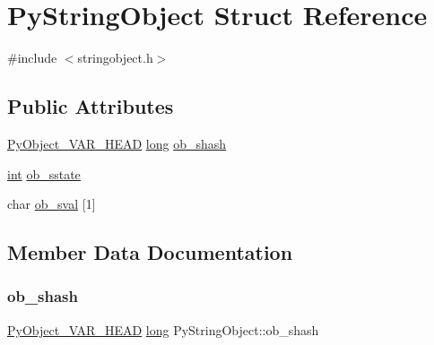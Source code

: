 \hypertarget{struct_py_string_object}{}\section{Py\+String\+Object Struct Reference}
\label{struct_py_string_object}


{\ttfamily \#include $<$stringobject.\+h$>$}

\subsection*{Public Attributes}
\begin{DoxyCompactItemize}
\item 
\mbox{\hyperlink{_python27_2object_8h_aa0eba161a76be8710b3de325c2e7f9e2}{Py\+Object\+\_\+\+V\+A\+R\+\_\+\+H\+E\+AD}} \mbox{\hyperlink{modsupport_8h_a0cb68e00fb9fb1260ee2daadd9fe6611}{long}} \mbox{\hyperlink{struct_py_string_object_af33fcc1603eed71de2fbb8c54ba32262}{ob\+\_\+shash}}
\item 
\mbox{\hyperlink{warnings_8h_a74f207b5aa4ba51c3a2ad59b219a423b}{int}} \mbox{\hyperlink{struct_py_string_object_a44f9f0102f89d22cb0d4ae4042ab92a1}{ob\+\_\+sstate}}
\item 
char \mbox{\hyperlink{struct_py_string_object_aa8286d87404dd10caf82bcd4835116d6}{ob\+\_\+sval}} \mbox{[}1\mbox{]}
\end{DoxyCompactItemize}


\subsection{Member Data Documentation}
\mbox{\label{struct_py_string_object_af33fcc1603eed71de2fbb8c54ba32262}} 
\subsubsection{\texorpdfstring{ob\_shash}{ob\_shash}}
{\footnotesize\ttfamily \mbox{\hyperlink{_python27_2object_8h_aa0eba161a76be8710b3de325c2e7f9e2}{Py\+Object\+\_\+\+V\+A\+R\+\_\+\+H\+E\+AD}} \mbox{\hyperlink{modsupport_8h_a0cb68e00fb9fb1260ee2daadd9fe6611}{long}} Py\+String\+Object\+::ob\+\_\+shash}

\mbox{\label{struct_py_string_object_a44f9f0102f89d22cb0d4ae4042ab92a1}} 

